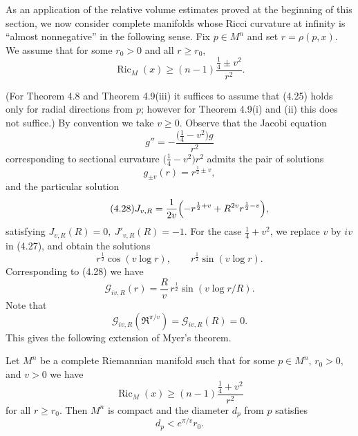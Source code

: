 As an application of the relative volume estimates proved at the beginning of
this section, we now consider complete manifolds whose Ricci curvature at
infinity is ``almost nonnegative'' in the following sense. Fix \(p\in M^n\) and
set \(r=\rho(p,x)\). We assume that for some \(r_0>0\) and all \(r\ge r_0\),
\begin{equation}\tag{4.25}
\operatorname{Ric}_M(x)\ge (n-1)\frac{\frac14\pm v^2}{r^2}.
\end{equation}

(For Theorem 4.8 and Theorem 4.9(iii) it suffices to assume that (4.25) holds
only for radial directions from \(p\); however for Theorem 4.9(i) and (ii) this
does not suffice.) By convention we take $v\ge 0$. Observe that the Jacobi
equation
\begin{equation}\tag{4.26}
g''=-\frac{\bigl(\frac14-v^2\bigr)g}{r^2}
\end{equation}
corresponding to sectional curvature \(\bigl(\frac14-v^2\bigr)r^2\) admits the
pair of solutions
\begin{equation}\tag{4.27}
g_{\pm v}(r)=r^{\frac12\pm v},
\end{equation}
and the particular solution
\begin{equation}\tag{4.28}
J_{v,R}=\frac{1}{2v}\Bigl(-r^{\frac12+v}+R^{2v}r^{\frac12-v}\Bigr),
\end{equation}
satisfying \(J_{v,R}(R)=0,\ J'_{v,R}(R)=-1\). For the case
\(\frac14+v^2\), we replace $v$ by $iv$ in (4.27), and obtain the solutions
\begin{equation}\tag{4.29}
r^{\frac12}\cos(v\log r),\qquad r^{\frac12}\sin(v\log r).
\end{equation}
Corresponding to (4.28) we have
\begin{equation}\tag{4.30}
\mathcal G_{iv,R}(r)=\frac{R}{v}\,r^{\frac12}\sin(v\log r/R).
\end{equation}
Note that
\begin{equation}\tag{4.31}
\mathcal G_{iv,R}(\Re^{\pi/v})=\mathcal G_{iv,R}(R)=0.
\end{equation}
This gives the following extension of Myer's theorem.

\begin{theorem}
\label{thm:asymptotic-ricci-compactness}
Let \(M^n\) be a complete Riemannian manifold such that for some
$p\in M^n,\, r_0>0,$ and $v>0$ we have
\begin{equation}\tag{4.32}
\operatorname{Ric}_M(x)\ge (n-1)\frac{\frac14+v^2}{r^2}
\end{equation}
for all \(r\ge r_0\). Then \(M^n\) is compact and the diameter $d_p$ from $p$
satisfies
\begin{equation}\tag{4.33}
d_p<e^{\pi/v}r_0.
\end{equation}
\end{theorem}

